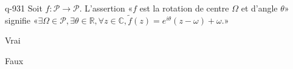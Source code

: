 \begin{truefalse}{q-931}
Soit $f:\mathcal P\to \mathcal P$. L'assertion «$f$ est la rotation de centre $\Omega$ et d'angle $\theta$» signifie «$\exists \Omega\in\mathcal P, \exists \theta\in\mathbb R, \forall z\in\mathbb C, \tilde f(z)=e^{i\theta}(z-\omega)+\omega$.»
\item Vrai
\item* Faux
\end{truefalse}

